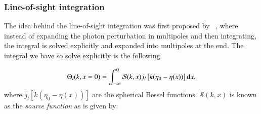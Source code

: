 \subsubsection{Line-of-sight integration}
    The idea behind the line-of-sight integration was first proposed by ~\cite{Seljak_1996}, where instead of expanding the photon perturbation in multipoles and then integrating, the integral is solved explicitly and expanded into multipoles at the end. The integral we have so solve explicitly is the following


    \begin{equation}\label{eq:m3:theory:line_of_sight_integral_definition}
        \Theta_l(k,x=0) = \int_{-\infty}^0 \mathcal{S}(k,x)j_l\left[k(\eta_0-\eta(x))\right]\mathrm{d} x,
    \end{equation}
    where $j_l\left[k(\eta_0-\eta(x))\right]$ are the spherical Bessel functions. $\mathcal{S}(k,x)$ is known as the \textit{source function} as is given by:
    
